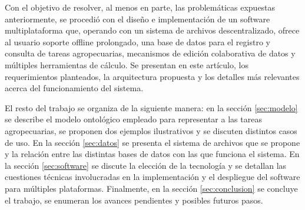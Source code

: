 Con el objetivo de resolver, al menos en parte, las problemáticas expuestas anteriormente, se procedió con el diseño e implementación de un software multiplataforma que, operando con un sistema de archivos descentralizado, ofrece al usuario soporte offline prolongado, una base de datos para el registro y consulta de tareas agropecuarias, mecanismos de edición colaborativa de datos y múltiples herramientas de cálculo. Se presentan en este artículo, los requerimientos planteados, la arquitectura propuesta y los detalles más relevantes acerca del funcionamiento del sistema. 

El resto del trabajo se organiza de la siguiente manera: en la sección \ref{sec:modelo} se describe el modelo ontológico empleado para representar a las tareas agropecuarias, se proponen dos ejemplos ilustrativos y se discuten distintos casos de uso. En la sección \ref{sec:datos} se presenta el sistema de archivos que se propone y la relación entre las distintas bases de datos con las que funciona el sistema. En la sección \ref{sec:software} se discute la elección de la tecnología y se detallan las cuestiones técnicas involucradas en la implementación y el despliegue del software para múltiples plataformas. Finalmente, en la sección \ref{sec:conclusion} se concluye el trabajo, se enumeran los avances pendientes y posibles futuros pasos. 